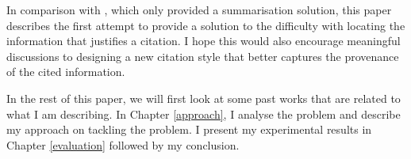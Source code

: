 In comparison with \cite{csibs}, which only provided a summarisation solution, this paper describes the first attempt to provide a solution to the difficulty with locating the information that justifies a citation. I hope this would also encourage meaningful discussions to designing a new citation style that better captures the provenance of the cited information.

In the rest of this paper, we will first look at some past works that are related to what I am describing. In Chapter \ref{approach}, I analyse the problem and describe my approach on tackling the problem. I present my experimental results in Chapter \ref{evaluation} followed by my conclusion.
